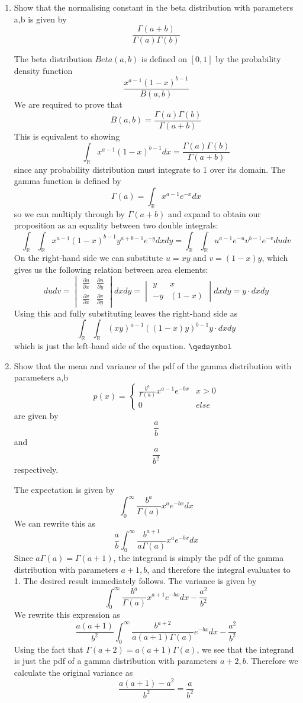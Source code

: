 \documentclass{article}
\newcommand{\chapternumber}{2}
\newenvironment{QandA}{\begin{enumerate}[label=\chapternumber.\arabic*]\bfseries\boldmath}
	{\end{enumerate}}
\newenvironment{answered}{\par\bigskip\normalfont\unboldmath}{}
\begin{document}
\begin{QandA}
		\item Show that the normalising constant in the beta distribution with parameters a,b is given by 
		\[\frac{\Gamma(a+b)}{\Gamma(a)\Gamma(b)}\]
		\begin{answered}
			The beta distribution $Beta(a,b)$ is defined on $[0,1]$ by the probability density function
			\[\frac{x^{a-1}(1-x)^{b-1}}{B(a,b)}\]
			We are required to prove that 
			\[B(a,b)=\frac{\Gamma(a)\Gamma(b)}{\Gamma(a+b)}\]
			This is equivalent to showing
			\[\int_\mathbb{R}x^{a-1}(1-x)^{b-1}dx=\frac{\Gamma(a)\Gamma(b)}{\Gamma(a+b)}\]
			since any probability distribution must integrate to 1 over its domain.
			The gamma function is defined by
			\[\Gamma(a)=\int_\mathbb{R}x^{a-1}e^{-x}dx\]
			so we can multiply through by $\Gamma(a+b)$ and expand to obtain our proposition as an equality between two double integrals:
			\[\int_\mathbb{R}\int_\mathbb{R}x^{a-1}(1-x)^{b-1}y^{a+b-1}e^{-y}dxdy=\int_\mathbb{R}\int_\mathbb{R}u^{a-1}e^{-u}v^{b-1}e^{-v}dudv\]
			On the right-hand side we can substitute $u=xy$ and $v=(1-x)y$, which gives us the following relation between area elements:
			\[dudv=\begin{vmatrix}
			\frac{\partial u}{\partial x} & \frac{\partial u}{\partial y}\\
			\frac{\partial v}{\partial x} & \frac{\partial v}{\partial y}
			\end{vmatrix}dxdy = 
			\begin{vmatrix}
			y & x\\
			-y & (1-x)
			\end{vmatrix}dxdy
			=y\cdot dxdy
			\]
			Using this and fully substituting leaves the right-hand side as
			\[\int_\mathbb{R}\int_\mathbb{R}(xy)^{a-1}((1-x)y)^{b-1}y\cdot dxdy\]
			which is just the left-hand side of the equation. $\qedsymbol$
		\end{answered}
	
	\item Show that the mean and variance of the pdf of the gamma distribution with parameters a,b 
	\[p(x)=\begin{cases}
	\frac{b^a}{\Gamma(a)}x^{a-1}e^{-bx} & x>0\\
	0 & else
	\end{cases}\]
	are given by
	\[\frac{a}{b}\]
	and
	\[\frac{a}{b^2}\]
	respectively.
	\begin{answered}
		The expectation is given by 
		\[\int_0^{\infty} \frac{b^a}{\Gamma(a)}x^ae^{-bx}dx\]
		We can rewrite this as
		\[\frac{a}{b}\int_0^{\infty}\frac{b^{a+1}}{a\Gamma(a)}x^a e^{-bx}dx\]
		Since $a\Gamma(a)=\Gamma(a+1)$, the integrand is simply the pdf of the gamma distribution with parameters $a+1,b$, and therefore the integral evaluates to 1. The desired result immediately follows.
		The variance is given by
		\[\int_0^{\infty} \frac{b^a}{\Gamma(a)}x^{a+1}e^{-bx}dx-\frac{a^2}{b^2}\]
		We rewrite this expression as 
		\[\frac{a(a+1)}{b^2}\int_0^{\infty}\frac{b^{a+2}}{a(a+1)\Gamma(a)}e^{-bx}dx-\frac{a^2}{b^2}\] Using the fact that $\Gamma(a+2)=a(a+1)\Gamma(a)$, we see that the integrand is just the pdf of a gamma distribution with parameters $a+2,b$. Therefore we calculate the original variance as 
		\[\frac{a(a+1)-a^2}{b^2}=\frac{a}{b^2}\]
	\end{answered}


\end{QandA}
\end{document}
